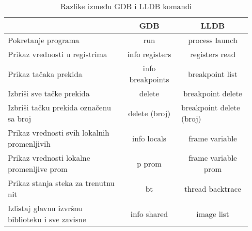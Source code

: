 \documentclass[a4paper]{article}
\begin{document}
\begin{table}[h!]
\begin{center}
\caption{Razlike između GDB i LLDB komandi}
\begin{tabular}{|l|c|c|} \hline
                                                 & GDB            & LLDB                                                                  \\ \hline
\rowcolor[HTML]{C0C0C0} 
Pokretanje programa                              & run            & process launch                                                        \\
Prikaz vrednosti u registrima                    & info registers & registers read                                                        \\
\rowcolor[HTML]{C0C0C0} 
Prikaz tačaka prekida                            & info breakpoints     & breakpoint list                                                       \\
Izbriši sve tačke prekida                        & delete         & breakpoint delete                                                     \\
\rowcolor[HTML]{C0C0C0} 
Izbriši tačku prekida označenu sa broj           & delete (broj)  & \multicolumn{1}{l|}{\cellcolor[HTML]{C0C0C0}breakpoint delete (broj)} \\
Prikaz vrednosti svih lokalnih promenljivih      & info locals    & frame variable                                                        \\
\rowcolor[HTML]{C0C0C0} 
Prikaz vrednosti lokalne promenljive prom        & p prom         & frame variable prom                                                   \\
Prikaz stanja steka za trenutnu nit              & bt             & thread backtrace                                                      \\
\rowcolor[HTML]{C0C0C0} 
Izlistaj glavnu izvršnu biblioteku i sve zavisne & info shared    & image list                                                            \\ \hline
\end{tabular}
\label{tab:tabela1}
\end{center}
\end{table}
\end{document}

